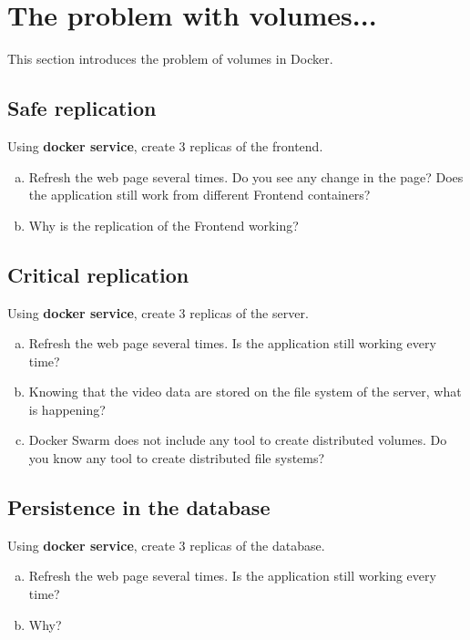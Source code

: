 \documentclass[a4paper,11pt]{exam}
\begin{document}
\section{The problem with volumes...}

This section introduces the problem of volumes in Docker.

\subsection{Safe replication}

\begin{questions}
	\question Using \textbf{docker service}, create 3 replicas of the frontend.
	\begin{enumerate}[(a)]
		\item Refresh the web page several times. Do you see any change in the page? Does the application still work from different Frontend containers?
		\item Why is the replication of the Frontend working?
	\end{enumerate}
\end{questions}

\subsection{Critical replication}

\begin{questions}
	\question Using \textbf{docker service}, create 3 replicas of the server.
	\begin{enumerate}[(a)]
		\item Refresh the web page several times. Is the application still working every time?
		\item Knowing that the video data are stored on the file system of the server, what is happening?
		\item Docker Swarm does not include any tool to create distributed volumes. Do you know any tool to create distributed file systems?
	\end{enumerate}
\end{questions}

\subsection{Persistence in the database}

\begin{questions}
	\question Using \textbf{docker service}, create 3 replicas of the database.
	\begin{enumerate}[(a)]
		\item Refresh the web page several times. Is the application still working every time?
		\item Why?
	\end{enumerate}
\end{questions}
\end{document}
